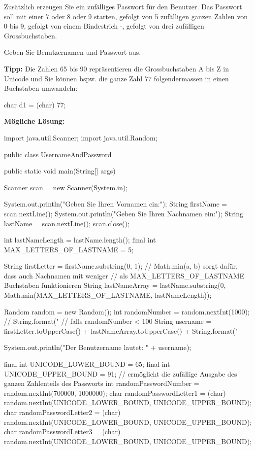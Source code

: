 \documentclass[a4paper,10pt, dvipsnames]{report}
\begin{document}
Zusätzlich erzeugen Sie ein zufälliges Passwort für den Benutzer. Das Passwort soll mit einer 7 oder 8 oder 9 starten, gefolgt von 5 zufälligen ganzen Zahlen von 0 bis 9, gefolgt von einem Bindestrich -, gefolgt von drei zufälligen Grossbuchstaben.

Geben Sie Benutzernamen und Passwort aus.

\textbf{Tipp:} Die Zahlen 65 bis 90 repräsentieren die Grossbuchstaben A bis Z in Unicode und Sie können bspw. die ganze Zahl 77 folgendermassen in einen Buchstaben umwandeln:

\begin{javacodebox}
char d1 = (char) 77;
\end{javacodebox}

\textbf{Mögliche Lösung:}

\begin{javacodebox}
import java.util.Scanner;
import java.util.Random;

public class UsernameAndPassword {
    public static void main(String[] args) {
        
        Scanner scan = new Scanner(System.in);

        System.out.println("Geben Sie Ihren Vornamen ein:");
        String firstName = scan.nextLine();
        System.out.println("Geben Sie Ihren Nachnamen ein:");
        String lastName = scan.nextLine();
        scan.close();

        int lastNameLength = lastName.length();
        final int MAX_LETTERS_OF_LASTNAME = 5;

        String firstLetter = firstName.substring(0, 1);
        // Math.min(a, b) sorgt dafür, dass auch Nachnamen mit weniger
        // als MAX_LETTERS_OF_LASTNAME Buchstaben funktionieren
        String lastNameArray = lastName.substring(0, Math.min(MAX_LETTERS_OF_LASTNAME,
						       lastNameLength));

        Random random = new Random();
        int randomNumber = random.nextInt(1000);
        // String.format("%
        // falls randomNumber < 100
        String username = firstLetter.toUpperCase() + lastNameArray.toUpperCase() +
				          String.format("%


        System.out.println("Der Benutzername lautet: " + username);

        final int UNICODE_LOWER_BOUND = 65;
        final int UNICODE_UPPER_BOUND = 91;
        // ermöglicht die zufällige Ausgabe des ganzen Zahlenteils des Passworts
        int randomPasswordNumber = random.nextInt(700000, 1000000);
        char randomPasswordLetter1 = (char) random.nextInt(UNICODE_LOWER_BOUND,
													       UNICODE_UPPER_BOUND);
        char randomPasswordLetter2 = (char) random.nextInt(UNICODE_LOWER_BOUND,
												           UNICODE_UPPER_BOUND);
        char randomPasswordLetter3 = (char) random.nextInt(UNICODE_LOWER_BOUND,
												           UNICODE_UPPER_BOUND);

}}
\end{javacodebox}
\end{document}
